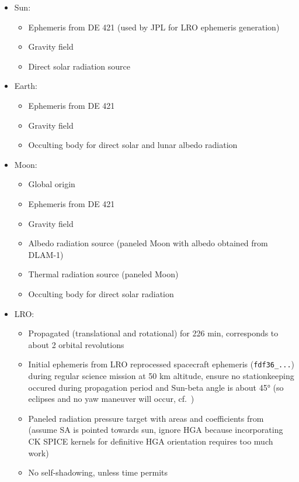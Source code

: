 \documentclass[parskip=full,DIV=15]{scrartcl}
\begin{document}
\begin{itemize}
   \item Sun:
   \begin{itemize}
      \item Ephemeris from DE 421 (used by JPL for LRO ephemeris generation)
      \item Gravity field
      \item Direct solar radiation source
   \end{itemize}
   \item Earth:
   \begin{itemize}
      \item Ephemeris from DE 421
      \item Gravity field
      \item Occulting body for direct solar and lunar albedo radiation
   \end{itemize}
   \item Moon:
   \begin{itemize}
      \item Global origin
      \item Ephemeris from DE 421
      \item Gravity field
      \item Albedo radiation source (paneled Moon with albedo obtained from DLAM-1)
      \item Thermal radiation source (paneled Moon)
      \item Occulting body for direct solar radiation
   \end{itemize}
   \item LRO:
   \begin{itemize}
      \item Propagated (translational and rotational) for 226 min, corresponds to about 2 orbital revolutions
      \item Initial ephemeris from LRO reprocessed spacecraft ephemeris (\texttt{fdf36\_...}) during regular science mission at 50 km altitude, ensure no stationkeeping occured during propagation period and Sun-beta angle is about \ang{45} (so eclipses and no yaw maneuver will occur, cf.~\cite[Fig.~12]{Tooley2010})
      \item Paneled radiation pressure target with areas and coefficients from \textcite{Smith2008} (assume SA is pointed towards sun, ignore HGA because incorporating CK SPICE kernels for definitive HGA orientation requires too much work)
      \item No self-shadowing, unless time permits
   \end{itemize}
\end{itemize}
\end{document}
